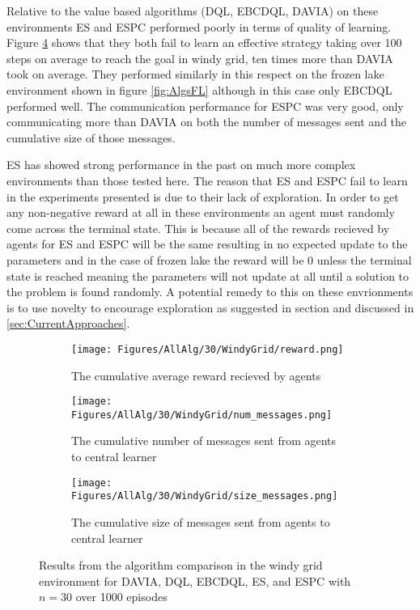 Relative to the value based algorithms (DQL, EBCDQL, DAVIA) on these environments ES and ESPC performed poorly in terms of quality of learning. Figure \ref{fig:AlgsWG} shows that they both fail to learn an effective strategy taking over 100 steps on average to reach the goal in windy grid, ten times more than DAVIA took on average. They performed similarly in this respect on the frozen lake environment shown in figure \ref{fig:AlgsFL} although in this case only EBCDQL performed well. The communication performance for ESPC was very good, only communicating more than DAVIA on both the number of messages sent and the cumulative size of those messages. 

ES has showed strong performance in the past on much more complex environments than those tested here. The reason that ES and ESPC fail to learn in the experiments presented is due to their lack of exploration. In order to get any non-negative reward at all in these environments an agent must randomly come across the terminal state. This is because all of the rewards recieved by agents for ES and ESPC will be the same resulting in no expected update to the parameters and in the case of frozen lake the reward will be 0 unless the terminal state is reached meaning the parameters will not update at all until a solution to the problem is found randomly. A potential remedy to this on these envrionments is to use novelty to encourage exploration as suggested in section \cite{NS-ES} and discussed in \ref{sec:CurrentApproaches}.

\begin{figure}
    \centering
    \begin{subfigure}{0.6\textwidth}
        \centering
        \texttt{[image: Figures/AllAlg/30/WindyGrid/reward.png]}
        \caption{The cumulative average reward recieved by agents}
        \label{fig:AlgsWGReward}
    \end{subfigure}
    \begin{subfigure}{0.6\textwidth}
        \centering
        \texttt{[image: Figures/AllAlg/30/WindyGrid/num\_messages.png]}
        \caption{The cumulative number of messages sent from agents to central learner}
        \label{fig:AlgsWGNumMessages}
    \end{subfigure}
    \begin{subfigure}{0.6\textwidth}
        \centering
        \texttt{[image: Figures/AllAlg/30/WindyGrid/size\_messages.png]}
        \caption{The cumulative size of messages sent from agents to central learner}
        \label{fig:AlgsWGSizeMessages}
    \end{subfigure}
    \caption{Results from the algorithm comparison in the windy grid environment for DAVIA, DQL, EBCDQL, ES, and ESPC with $n=30$ over 1000 episodes}
    \label{fig:AlgsWG}
\end{figure}

